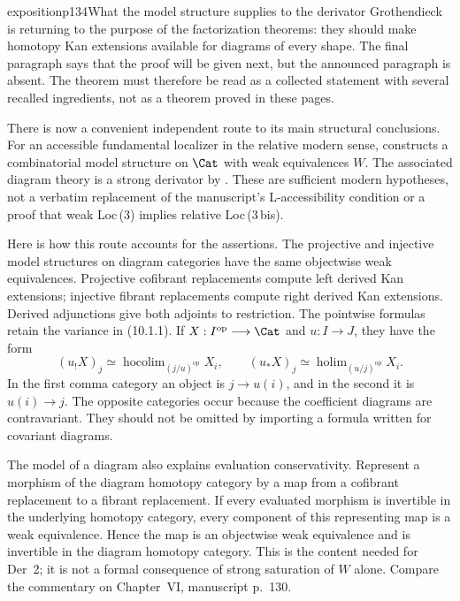 \begin{dcomment}{exposition}{p134}{What the model structure supplies to the derivator}
Grothendieck is returning to the purpose of the factorization theorems: they should make homotopy Kan extensions available for diagrams of every shape. The final paragraph says that the proof will be given next, but the announced paragraph is absent. The theorem must therefore be read as a collected statement with several recalled ingredients, not as a theorem proved in these pages.

There is now a convenient independent route to its main structural conclusions. For an accessible fundamental localizer in the relative modern sense, \citet[Theorem 5.2.15]{Cisinski2006} constructs a combinatorial model structure on $\Cat$ with weak equivalences $W$. The associated diagram theory is a strong derivator by \citet[Proposition 1.30]{Groth2013}. These are sufficient modern hypotheses, not a verbatim replacement of the manuscript's L-accessibility condition or a proof that weak Loc\,(3) implies relative Loc\,(3\,bis).

Here is how this route accounts for the assertions. The projective and injective model structures on diagram categories have the same objectwise weak equivalences. Projective cofibrant replacements compute left derived Kan extensions; injective fibrant replacements compute right derived Kan extensions. Derived adjunctions give both adjoints to restriction. The pointwise formulas retain the variance in (10.1.1). If $X:I^{\mathrm{op}}\longrightarrow\Cat$ and $u:I\longrightarrow J$, they have the form
\[
 (u_!X)_j\simeq
 \operatorname{hocolim}_{(j/u)^{\mathrm{op}}}X_i,
 \qquad
 (u_*X)_j\simeq
 \operatorname{holim}_{(u/j)^{\mathrm{op}}}X_i.
\]
In the first comma category an object is $j\longrightarrow u(i)$, and in the second it is $u(i)\longrightarrow j$. The opposite categories occur because the coefficient diagrams are contravariant. They should not be omitted by importing a formula written for covariant diagrams.

The model of a diagram also explains evaluation conservativity. Represent a morphism of the diagram homotopy category by a map from a cofibrant replacement to a fibrant replacement. If every evaluated morphism is invertible in the underlying homotopy category, every component of this representing map is a weak equivalence. Hence the map is an objectwise weak equivalence and is invertible in the diagram homotopy category. This is the content needed for Der~2; it is not a formal consequence of strong saturation of $W$ alone. Compare the commentary on Chapter~VI, manuscript p.~130.


\end{dcomment}
